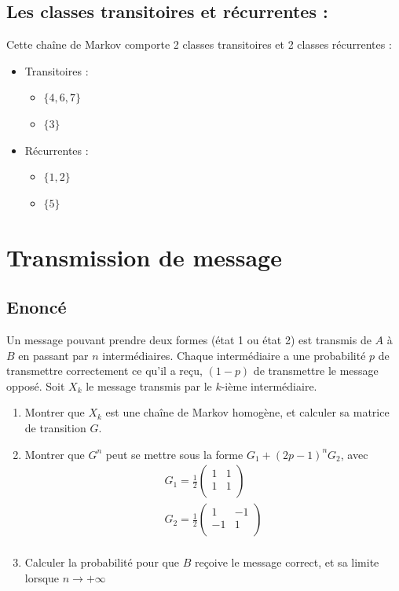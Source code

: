 \documentclass[10pt,a4paper,twoside]{article}
\begin{document}
\subsection{Les classes transitoires et récurrentes :}
Cette chaîne de Markov comporte 2 classes transitoires et 2 classes récurrentes :
\begin{itemize}
\item Transitoires :
\begin{itemize}
\item $\{4,6,7\}$
\item $\{3\}$
\end{itemize}
\item Récurrentes :
\begin{itemize}
\item $\{1,2\}$
\item $\{5\}$
\end{itemize}
\end{itemize}

\section{Transmission de message}
\subsection*{Enoncé}
Un message pouvant prendre deux formes (état 1 ou état 2) est transmis de $A$ à $B$ en passant par $n$ intermédiaires. Chaque intermédiaire a une probabilité $p$ de transmettre correctement ce qu'il a reçu, $(1-p)$ de transmettre le message opposé. Soit $X_{k}$ le message transmis par le $k$-ième intermédiaire. 
\begin{enumerate}
\item Montrer que $X_{k}$ est une chaîne de Markov homogène, et calculer sa matrice de transition $G$.
\item Montrer que $G^{n}$ peut se mettre sous la forme $G_{1}+(2p-1)^{n}G_{2}$, avec
\begin{align*}
G_{1}=\frac{1}{2}\left(\begin{array}{cc}
 1 & 1\\
 1 & 1 \\
\end{array}\right)\\
G_{2}=\frac{1}{2}\left(\begin{array}{cc}
 1 & -1\\
 -1 & 1 \\
\end{array}\right)\\
\end{align*}
\item Calculer la probabilité pour que $B$ reçoive le message correct, et sa limite lorsque $n\rightarrow +\infty$
\end{enumerate}
\end{document}
